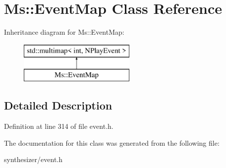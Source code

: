 \hypertarget{class_ms_1_1_event_map}{}\section{Ms\+:\+:Event\+Map Class Reference}
\label{class_ms_1_1_event_map}
Inheritance diagram for Ms\+:\+:Event\+Map\+:\begin{figure}[H]
\begin{center}
\leavevmode
\includegraphics[height=2.000000cm]{class_ms_1_1_event_map}
\end{center}
\end{figure}


\subsection{Detailed Description}


Definition at line 314 of file event.\+h.



The documentation for this class was generated from the following file\+:\begin{DoxyCompactItemize}
\item 
synthesizer/event.\+h\end{DoxyCompactItemize}
